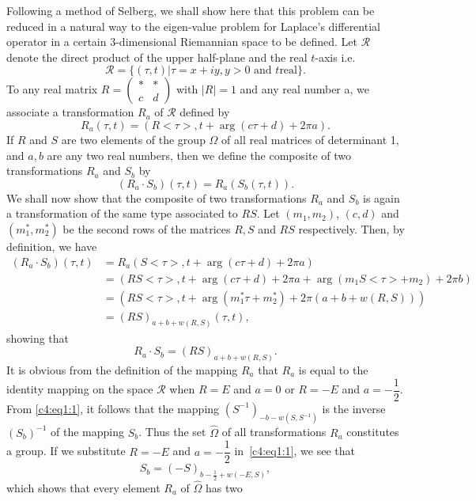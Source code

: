 Following a method of Selberg, we shall show here that this problem
can be reduced in a natural way to the eigen-value problem for
Laplace's differential operator in a certain 3-dimensional Riemannian
space to be defined. Let $\mathscr{R}$ denote the direct product of
the upper half-plane and the real $t$-axis i.e.
$$
\mathscr{R} = \{(\tau,t)| \tau = x+ iy, y >0 \text{ and } t \text{
  real}\}. 
$$
To any real matrix $R = \left(\begin{smallmatrix}
\ast & \ast \\ c & d\end{smallmatrix}\right)$ with $|R|=1$ and any
real number a, we associate a transformation $R_a$ of $\mathscr{R}$
defined by 
$$
R_a(\tau, t) = (R<\tau>, t + \arg(c\tau+d) + 2\pi a).
$$
If $R$ and $S$ are two elements of the group $\Omega$ of all real
matrices of determinant 1, and $a,b$ are any two real numbers, then we
define the composite of two transformations $R_a$ and $S_b$ by
$$
(R_a\cdot S_b) (\tau, t) =R_a (S_b(\tau, t)).
$$
We shall now show that the composite of two transformations $R_a$ and
$S_b$ is again a transformation of the same type associated to
$RS$. Let $(m_1, m_2)$, $(c,d)$ and $(m^{\ast}_1, m^{\ast}_2)$ be the
second rows of the matrices $R,S$ and $RS$
respectively. \pageoriginale Then, by definition, we have 
{\fontsize{9}{11}\selectfont
\begin{align*}
(R_a\cdot S_b) (\tau,t) & = R_a(S<\tau>, t + \arg(c\tau+d)+2\pi a)\\
& = (RS<\tau>, t + \arg(c\tau+d) + 2\pi a+ \arg(m_1S<\tau>+m_2)+2\pi
  b)\\
& =(RS<\tau>, t + \arg(m^{\ast}_1\tau + m^{\ast}_2) + 2\pi
  (a+b+w(R,S)))\\
& = (RS)_{a+b+w(R,S)} (\tau,t),
\end{align*}}\relax
showing that
\begin{equation*}
R_a \cdot S_b = (RS)_{a+b+w(R,S)}. \tag{1}\label{c4:eq1:1}
\end{equation*}
It is obvious from the definition of the mapping $R_a$ that $R_a$ is
equal to the identity mapping on the space $\mathscr{R}$ when $R=E$
and $a=0$ or $R=-E$ and $a=-\dfrac{1}{2}$. From \eqref{c4:eq1:1}, it follows that
the mapping $(S^{-1})_{-b-w(S,S^{-1})}$ is the inverse $(S_b)^{-1}$ of
the mapping $S_b$. Thus the set $\hat{\Omega}$ of all transformations
$R_a$ constitutes a group. If we substitute $R=-E$ and
$a=-\dfrac{1}{2}$ in~\eqref{c4:eq1:1}, we see that 
$$
S_b= (-S)_{b-\frac{1}{2}+w(-E,S)},
$$
which shows that every element $R_a$ of $\hat{\Omega}$ has two
